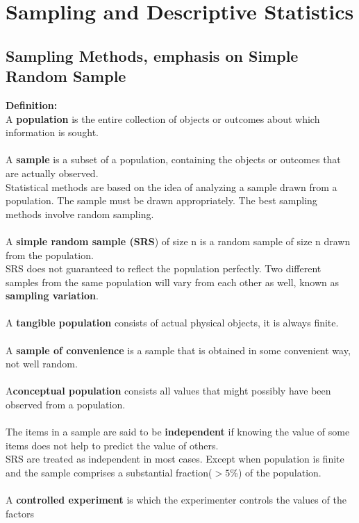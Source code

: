 \documentclass[../main.tex]{subfiles}
\begin{document}
\section{Sampling and Descriptive Statistics}
\subsection{Sampling Methods, emphasis on Simple Random Sample}

\textbf{Definition:}\\
A \textbf{population} is the entire collection of objects or outcomes about which information is sought.
\\\\
A \textbf{sample} is a subset of a population, containing the objects or outcomes that are actually observed.
\\
Statistical methods are based on the idea of analyzing a sample drawn from a population. The sample must be drawn appropriately. The best sampling methods involve random sampling. 
\\\\
A \textbf{simple random sample (SRS}) of size n is a random sample of size n drawn from the population.
\\
SRS does not guaranteed to reflect the population perfectly. Two different samples from the same population will vary from each other as well, known as \textbf{sampling variation}.
\\\\
A \textbf{tangible population} consists of actual physical objects, it is always finite.
\\\\
A \textbf{sample of convenience} is a sample that is obtained in some convenient way, not well random.
\\\\
A\textbf{conceptual population} consists all values that might possibly have been observed from a population.
\\\\
The items in a sample are said to be \textbf{independent} if knowing the value of some items does not help to predict the value of others.\\
SRS are treated as independent in most cases. Except when population is finite and the sample comprises a substantial fraction($>5$\%) of the population.
\\\\
A \textbf{controlled experiment} is which the experimenter controls the values of the factors
\end{document}
